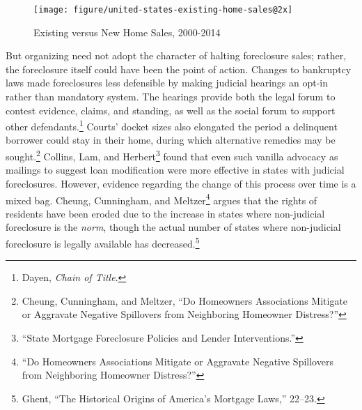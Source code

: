\documentclass[
]{article}
\let\rmarkdownfootnote\footnote%
\def\footnote{\protect\rmarkdownfootnote}
\begin{document}
\begin{figure}

{\centering \texttt{[image: figure/united-states-existing-home-sales@2x]} 

}

\caption{Existing versus New Home Sales, 2000-2014}\label{fig:tradingecon}
\end{figure}

But organizing need not adopt the character of halting foreclosure
sales; rather, the foreclosure itself could have been the point of
action. Changes to bankruptcy laws made foreclosures less defensible by
making judicial hearings an opt-in rather than mandatory system. The
hearings provide both the legal forum to contest evidence, claims, and
standing, as well as the social forum to support other
defendants.\footnote{Dayen, \emph{Chain of Title}.} Courts' docket sizes
also elongated the period a delinquent borrower could stay in their
home, during which alternative remedies may be sought.\footnote{Cheung,
  Cunningham, and Meltzer, ``Do Homeowners Associations Mitigate or
  Aggravate Negative Spillovers from Neighboring Homeowner Distress?''}
Collins, Lam, and Herbert\footnote{``State Mortgage Foreclosure Policies
  and Lender Interventions.''} found that even such vanilla advocacy as
mailings to suggest loan modification were more effective in states with
judicial foreclosures. However, evidence regarding the change of this
process over time is a mixed bag. Cheung, Cunningham, and
Meltzer\footnote{``Do Homeowners Associations Mitigate or Aggravate
  Negative Spillovers from Neighboring Homeowner Distress?''} argues
that the rights of residents have been eroded due to the increase in
states where non-judicial foreclosure is the \emph{norm}, though the
actual number of states where non-judicial foreclosure is legally
available has decreased.\footnote{Ghent, ``The Historical Origins of
  America's Mortgage Laws,'' 22--23.}
\end{document}
